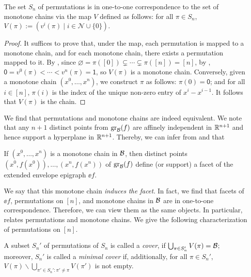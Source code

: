 \begin{proposition}
\label{prop.one2one}
The set $S_n$ of permutations is in one-to-one correspondence to the set of monotone chains via the map $V$ defined as follows: for all $\pi \in S_n$, $V(\pi):= (v^i(\pi) \;|\; i\in\mathcal{N}\cup\{0\})$.
\end{proposition}
\begin{proof}
It suffices to prove that, under the map, each permutation is mapped to a monotone chain, and for each monotone chain, there exists a permutation mapped to it.
By , since $\varnothing = \pi([0]) \subsetneq \cdots \subsetneq  \pi([n]) = [n]$, by , $\mathsf{0} = v^0(\pi) < \cdots < v^n(\pi) = \mathsf{1}$, so $V(\pi)$ is a monotone chain. Conversely, given a monotone chain $(x^0, \dots, x^n)$, we construct $\pi$ as follows: $\pi(0) = \mathsf{0}$; and for all $i \in [n]$, $\pi(i)$ is the index  of the unique non-zero entry of $x^i - x^{i-1}$. It follows that $V(\pi)$ is the chain.
\end{proof}



We find that  permutations and monotone chains are indeed equivalent. We note that any $n+1$ distinct points from $\operatorname{gr}_{\mathcal B}(f)$ are affinely independent in $\mathbb R^{n+1}$ and hence support a hyperplane in $\mathbb R^{n+1}$. Thereby, we can infer from  and  that \begin{corollary}
 If $(x^0, \dots, x^n)$ is a monotone chain in $\mathcal B$, then distinct points $ (x^0,f(x^0)), \dots,  (x^n,f(x^n))$ of $\operatorname{gr}_{\mathcal B}(f)$ define (or support) a facet of the extended envelope epigraph $\ee{f}$.
\end{corollary}


We say that this monotone chain \textit{induces the facet}. In fact, we find that facets of $\ee{f}$, permutations on $[n]$, and monotone chains in $\mathcal B$ are in one-to-one correspondence. Therefore, we can view them as the same objects. In particular,   relates permutations and monotone chains. We give the following characterization of permutations on $[n]$.



\begin{definition}
A subset $S_n'$ of permutations of $S_n$   is called  a \textit{cover}, if $\bigcup_{\pi \in S_n'} V(\pi) = \mathcal B$;  moreover, $S_n'$ is  called a \textit{minimal cover} if, additionally, for all $\pi \in S_n'$, $V(\pi) \smallsetminus \bigcup_{\pi' \in S_n': \pi' \ne \pi} V(\pi')$ is not empty.    
\end{definition}



